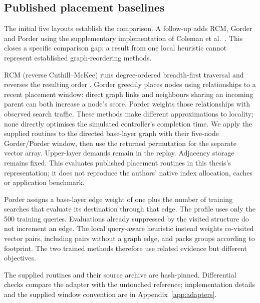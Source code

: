 \subsection{Published placement baselines}
The initial five layouts establish the comparison. A follow-up adds RCM, Gorder and Porder using the supplementary implementation of Coleman et al.~\cite{coleman}. This closes a specific comparison gap: a result from one local heuristic cannot represent established graph-reordering methods.

RCM (reverse Cuthill--McKee) runs degree-ordered breadth-first traversal and reverses the resulting order \cite{cuthill,coleman}. Gorder \cite{gorder} greedily places nodes using relationships to a recent placement window: direct graph links and neighbours sharing an incoming parent can both increase a node's score. Porder weights those relationships with observed search traffic. These methods make different approximations to locality; none directly optimises the simulated controller's completion time. We apply the supplied routines to the directed base-layer graph with their five-node Gorder/Porder window, then use the returned permutation for the separate vector array. Upper-layer demands remain in the replay. Adjacency storage remains fixed. This evaluates published placement routines in this thesis's representation; it does not reproduce the authors' native index allocation, caches or application benchmark.

Porder assigns a base-layer edge weight of one plus the number of training searches that evaluate its destination through that edge. The profile uses only the 500 training queries. Evaluations already suppressed by the visited structure do not increment an edge. The local query-aware heuristic instead weights co-visited vector pairs, including pairs without a graph edge, and packs groups according to footprint. The two trained methods therefore use related evidence but different objectives.

The supplied routines and their source archive are hash-pinned. Differential checks compare the adapter with the untouched reference; implementation details and the supplied window convention are in Appendix~\ref{app:adapters}.
